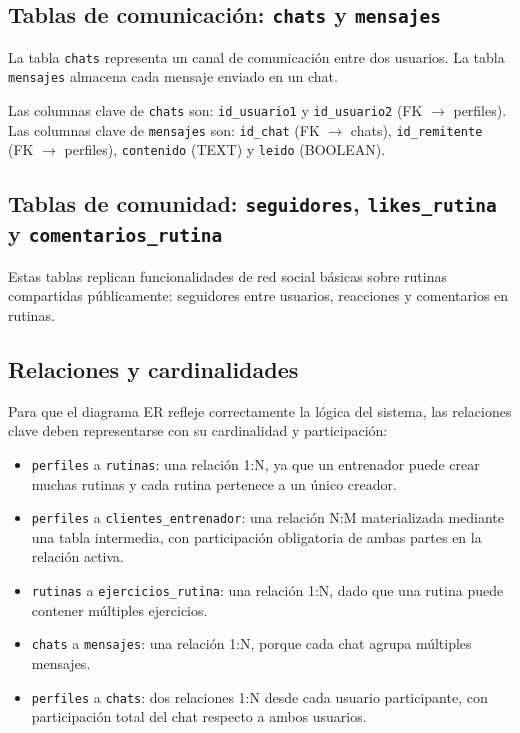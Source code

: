 \subsection{Tablas de comunicación: \texttt{chats} y \texttt{mensajes}}

La tabla \texttt{chats} representa un canal de comunicación entre dos usuarios. La tabla \texttt{mensajes} almacena cada mensaje enviado en un chat.

Las columnas clave de \texttt{chats} son: \texttt{id\_usuario1} y \texttt{id\_usuario2} (FK $\to$ perfiles).\\
Las columnas clave de \texttt{mensajes} son: \texttt{id\_chat} (FK $\to$ chats), \texttt{id\_remitente} (FK $\to$ perfiles), \texttt{contenido} (TEXT) y \texttt{leido} (BOOLEAN).

\subsection{Tablas de comunidad: \texttt{seguidores}, \texttt{likes\_rutina} y \texttt{comentarios\_rutina}}

Estas tablas replican funcionalidades de red social básicas sobre rutinas compartidas públicamente: seguidores entre usuarios, reacciones y comentarios en rutinas.

\subsection{Relaciones y cardinalidades}

Para que el diagrama ER refleje correctamente la lógica del sistema, las relaciones clave deben representarse con su cardinalidad y participación:

\begin{itemize}
  \item \texttt{perfiles} a \texttt{rutinas}: una relación 1:N, ya que un entrenador puede crear muchas rutinas y cada rutina pertenece a un único creador.
  \item \texttt{perfiles} a \texttt{clientes\_entrenador}: una relación N:M materializada mediante una tabla intermedia, con participación obligatoria de ambas partes en la relación activa.
  \item \texttt{rutinas} a \texttt{ejercicios\_rutina}: una relación 1:N, dado que una rutina puede contener múltiples ejercicios.
  \item \texttt{chats} a \texttt{mensajes}: una relación 1:N, porque cada chat agrupa múltiples mensajes.
  \item \texttt{perfiles} a \texttt{chats}: dos relaciones 1:N desde cada usuario participante, con participación total del chat respecto a ambos usuarios.
\end{itemize}

